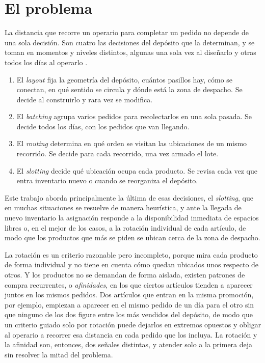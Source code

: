 \section{El problema}

La distancia que recorre un operario para completar un pedido no depende de una sola decisión.
Son cuatro las decisiones del depósito que la determinan, y se toman en momentos y niveles distintos, algunas una sola vez al diseñarlo y otras todos los días al operarlo \citep{gu2007research, dekoster2007design}.
\begin{enumerate}
  \item El \emph{layout} fija la geometría del depósito, cuántos pasillos hay, cómo se conectan, en qué sentido se circula y dónde está la zona de despacho. Se decide al construirlo y rara vez se modifica.
  \item El \emph{batching} agrupa varios pedidos para recolectarlos en una sola pasada. Se decide todos los días, con los pedidos que van llegando.
  \item El \emph{routing} determina en qué orden se visitan las ubicaciones de un mismo recorrido. Se decide para cada recorrido, una vez armado el lote.
  \item El \emph{slotting} decide qué ubicación ocupa cada producto. Se revisa cada vez que entra inventario nuevo o cuando se reorganiza el depósito.
\end{enumerate}

Este trabajo aborda principalmente la última de esas decisiones, el \emph{slotting}, que en muchas situaciones se resuelve de manera heurística, y ante la llegada de nuevo inventario la asignación responde a la disponibilidad inmediata de espacios libres o, en el mejor de los casos, a la rotación individual de cada artículo, de modo que los productos que más se piden se ubican cerca de la zona de despacho.

La rotación es un criterio razonable pero incompleto, porque mira cada producto de forma individual y no tiene en cuenta cómo quedan ubicados unos respecto de otros.
Y los productos no se demandan de forma aislada, existen patrones de compra recurrentes, o \emph{afinidades}, en los que ciertos artículos tienden a aparecer juntos en los mismos pedidos.
Dos artículos que entran en la misma promoción, por ejemplo, empiezan a aparecer en el mismo pedido de un día para el otro sin que ninguno de los dos figure entre los más vendidos del depósito, de modo que un criterio guiado solo por rotación puede dejarlos en extremos opuestos y obligar al operario a recorrer esa distancia en cada pedido que los incluya.
La rotación y la afinidad son, entonces, dos señales distintas, y atender solo a la primera deja sin resolver la mitad del problema.

